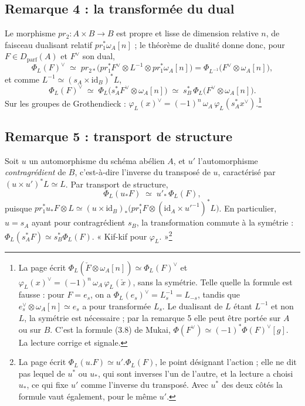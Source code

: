 \documentclass[11pt,a4paper]{article}
\begin{document}
\subsection*{Remarque 4 : la transformée du dual}

Le morphisme $pr_2 \colon A \times B \to B$ est propre et lisse de dimension
relative $n$, de faisceau dualisant relatif $pr_1^{*}\omega_A[n]$ ; le
théorème de dualité donne donc, pour $F \in D_{\mathrm{parf}}(A)$ et
$F^{\vee}$ son dual,
\[
  \Phi_L(F)^{\vee} \;\simeq\; pr_{2*}\bigl(pr_1^{*}F^{\vee} \otimes L^{-1} \otimes pr_1^{*}\omega_A[n]\bigr)
  = \Phi_{L^{-1}}\bigl(F^{\vee} \otimes \omega_A[n]\bigr),
\]
et comme $L^{-1} \simeq (s_A \times \mathrm{id}_B)^{*}L$,
\[
  \Phi_L(F)^{\vee} \;\simeq\; \Phi_L\bigl(s_A^{*}F^{\vee} \otimes \omega_A[n]\bigr)
  \;\simeq\; s_B^{*}\,\Phi_L\bigl(F^{\vee} \otimes \omega_A[n]\bigr).
\]
Sur les groupes de Grothendieck :
$\varphi_L(x)^{\vee} = (-1)^n\,\omega_A\,\varphi_L(s_A^{*}x^{\vee})$.\footnote{La page écrit $\Phi_L(\check F \otimes \omega_A[n]) \simeq
\Phi_L(F)^{\vee}$ et $\varphi_L(x)^{\vee} = (-1)^n\,\omega_A\,
\varphi_L(\check x)$, sans la symétrie. Telle quelle la formule est fausse :
pour $F = e_s$, on a $\Phi_L(e_s)^{\vee} = L_s^{-1} = L_{-s}$, tandis que
$e_s^{\vee} \otimes \omega_A[n] \simeq e_s$ a pour transformée $L_s$. Le
dualisant de $L$ étant $L^{-1}$ et non $L$, la symétrie est nécessaire ; par
la remarque 5 elle peut être portée sur $A$ ou sur $B$. C'est la formule
(3.8) de Mukai, $\Phi(F^{\vee}) \simeq (-1)^{*}\Phi(F)^{\vee}[g]$. La lecture
corrige et signale.}

\subsection*{Remarque 5 : transport de structure}

Soit $u$ un automorphisme du schéma abélien $A$, et $u'$ l'automorphisme
\emph{contragrédient} de $B$, c'est-à-dire l'inverse du transposé de $u$,
caractérisé par $(u \times u')^{*}L \simeq L$. Par transport de structure,
\[
  \Phi_L(u_{*}F) \;\simeq\; u'_{*}\,\Phi_L(F),
\]
puisque $pr_1^{*}u_{*}F \otimes L \simeq (u \times \mathrm{id}_B)_{*}
\bigl(pr_1^{*}F \otimes (\mathrm{id}_A \times u'^{-1})^{*}L\bigr)$. En
particulier, $u = s_A$ ayant pour contragrédient $s_B$, la transformation
commute à la symétrie : $\Phi_L(s_A^{*}F) \simeq s_B^{*}\Phi_L(F)$. « Kif-kif
pour $\varphi_L$. »\footnote{La page écrit $\Phi_L(u.F) \simeq
u'.\Phi_L(F)$, le point désignant l'action ; elle ne dit pas lequel de $u^{*}$
ou $u_{*}$, qui sont inverses l'un de l'autre, et la lecture a choisi
$u_{*}$, ce qui fixe $u'$ comme l'inverse du transposé. Avec $u^{*}$ des deux
côtés la formule vaut également, pour le même $u'$.}
\end{document}
